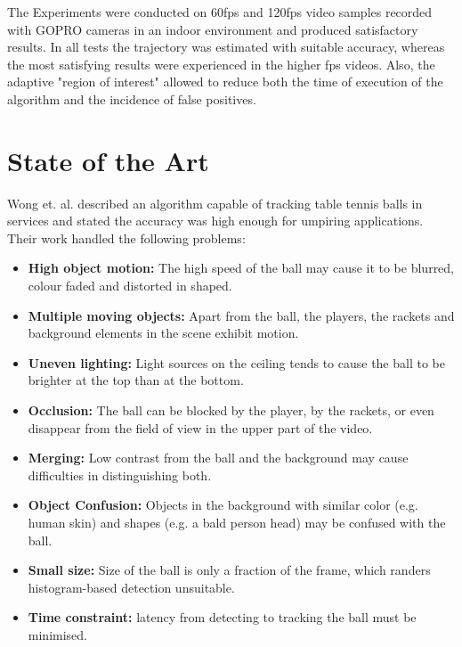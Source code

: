\documentclass[a4paper]{article}
\begin{document}
The Experiments were conducted on 60fps and 120fps video samples recorded with GOPRO cameras in an indoor environment and produced satisfactory results. In all tests the trajectory was estimated with suitable accuracy, whereas the most satisfying results were experienced in the higher fps videos. Also, the adaptive "region of interest" allowed to reduce both the time of execution of the algorithm and the incidence of false positives. 
   
  
\section{State of the Art}

Wong et. al.\cite{Wong} described an algorithm capable of tracking table tennis balls in services and stated the accuracy was high enough for umpiring applications. Their work handled the following problems:

\begin{itemize}
\item \textbf{High object motion:} The high speed of the ball may cause it to be blurred, colour faded and distorted in shaped.
\item \textbf{Multiple moving objects:} Apart from the ball, the players, the rackets and background elements in the scene exhibit motion.  
\item \textbf{Uneven lighting:} Light sources on the ceiling tends to cause the ball to be brighter at the top than at the bottom.
\item \textbf{Occlusion:} The ball can be blocked by the player, by the rackets, or even disappear from the field of view in the upper part of the video.
\item \textbf{Merging:} Low contrast from the ball and the background may cause difficulties in distinguishing both.
\item \textbf{Object Confusion:} Objects in the background with similar color (e.g. human skin) and shapes (e.g. a bald person head) may be confused with the ball. 
\item \textbf{Small size:} Size of the ball is only a fraction of the frame, which randers histogram-based detection unsuitable.
\item \textbf{Time constraint:} latency from detecting to tracking the ball must be minimised.
\end{itemize}
\end{document}
